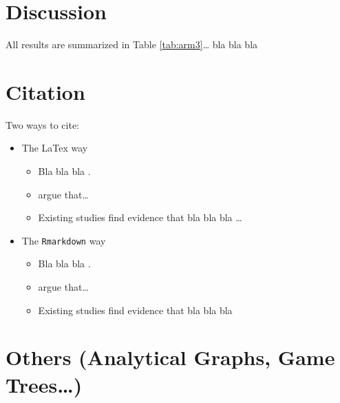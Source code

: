 \documentclass[11pt,]{article}
\providecommand{\tightlist}{%
  \setlength{\itemsep}{0pt}\setlength{\parskip}{0pt}}
\begin{document}
\normalsize

\clearpage

\section{Discussion}\label{discussion}

All results are summarized in Table \ref{tab:arm3}\ldots{} bla bla bla

\section{Citation}\label{citation}

\tiny

\normalsize

Two ways to cite:

\begin{itemize}
\tightlist
\item
  The LaTex way

  \begin{itemize}
  \tightlist
  \item
    Bla bla bla \citep{johnston2014ideology}.
  \item
    \citet[][p.234]{beramendi2008democracy} argue that\ldots{}
  \item
    Existing studies find evidence that bla bla bla
    \citep[see][for detailed explanation]{stegmueller2013many,bell2015explaining}\ldots{}
  \end{itemize}
\item
  The \texttt{Rmarkdown} way

  \begin{itemize}
  \tightlist
  \item
    Bla bla bla \citep{johnston2014ideology}.
  \item
    \citet{beramendi2008democracy} argue that\ldots{}
  \item
    Existing studies find evidence that bla bla bla \citep[see][ for
    details]{stegmueller2013many, bell2015explaining}
  \end{itemize}
\end{itemize}

\clearpage



\clearpage

\section{Others (Analytical Graphs, Game
Trees\ldots{})}\label{others-analytical-graphs-game-trees}
\end{document}

